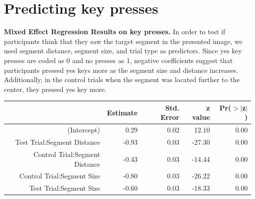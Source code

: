 \documentclass{article}
\begin{document}
\section{Predicting key presses}
\textbf{Mixed Effect Regression Results on key presses.} In order to test if participants think that they saw the target segment in the presented image, we used segment distance, segment size, and trial type as predictors. Since yes key presses are coded as 0 and no presses as 1, negative coefficients suggest that participants pressed yes keys more as the segment size and distance increases. Additionally, in the control trials when the segment was located further to the center, they pressed yes key more. 
\label{table:keyPress}    
\begin{table}[ht]
\centering
\begin{tabular}{rrrrr}
  \hline
 & Estimate & Std. Error & z value & Pr($>$$|$z$|$) \\ 
  \hline
(Intercept) & 0.29 & 0.02 & 12.10 & 0.00 \\ 
  Test Trial:Segment Distance & -0.93 & 0.03 & -27.30 & 0.00 \\ 
  Control Trial:Segment Distance & -0.43 & 0.03 & -14.44 & 0.00 \\ 
  Control Trial:Segment Size & -0.80 & 0.03 & -26.22 & 0.00 \\ 
  Test Trial:Segment Size & -0.60 & 0.03 & -18.33 & 0.00 \\ 
   \hline
\end{tabular}
\end{table}
\end{document}

